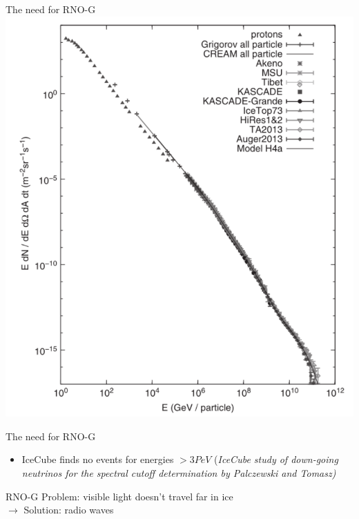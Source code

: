 \documentclass{beamer}
\begin{document}
\begin{frame}{The need for RNO-G}
  \centering
  \includegraphics[height=0.9\textheight]{figures/cosmic_ray_flux.pdf}
\end{frame}
\begin{frame}{The need for RNO-G}
\begin{itemize}
	\item IceCube finds no events for energies $> 3PeV$ (\it{IceCube study of down-going neutrinos for the spectral cutoff determination by Palczewski and Tomasz})
\end{itemize}
\end{frame}
\begin{frame}{RNO-G}
  Problem: visible light doesn't travel far in ice\\
  $\rightarrow$ Solution: radio waves
\end{frame}
\end{document}
